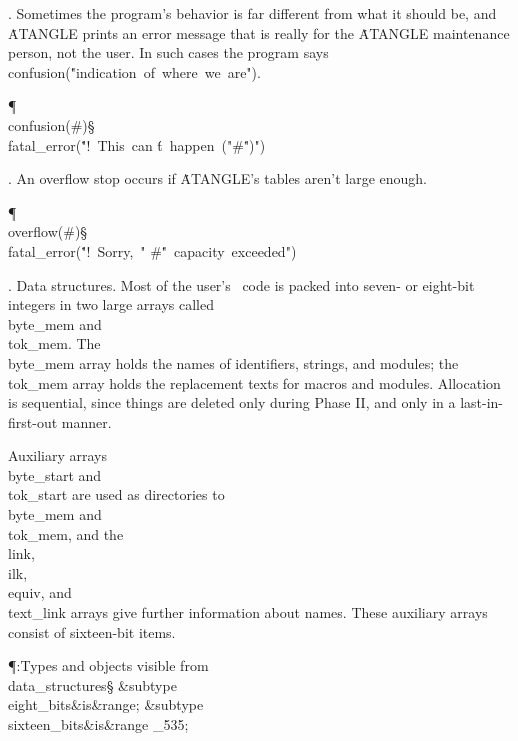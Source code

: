 . Sometimes the program's behavior is far different from what it should be,
and \.{ATANGLE} prints an error message that is really for the \.{ATANGLE}
maintenance person, not the user. In such cases the program says
\\{confusion}\?(\?\.{"indication\ of\ where\ we\ are"}\?)\?.

\Y\P\4\D\\{confusion}\?\1(\?\#\?\2)\S\?\\{fatal\_error}\?\1(\?\.{"!\ This\ can%
\'t\ happen\ ("}\?\mathbin{\.\&}\?\#\?\mathbin{\.\&}\?\.{")"}\?\2)\6
\?\par
\fi

. An overflow stop occurs if \.{ATANGLE}'s tables aren't large enough.

\Y\P\4\D\\{overflow}\?\1(\?\#\?\2)\S\?\\{fatal\_error}\?\1(\?\.{"!\ Sorry,\ "}%
\?\mathbin{\.\&}\?\#\?\mathbin{\.\&}\?\.{"\ capacity\ exceeded"}\?\2)\6
\?\par
\fi

.  Data structures.
Most of the user's \ADA\ code is packed into seven- or eight-bit integers
in two large arrays called \\{byte\_mem} and \\{tok\_mem}.
The \\{byte\_mem} array holds the names of identifiers, strings, and modules;
the \\{tok\_mem} array holds the replacement texts
for macros and modules. Allocation is sequential, since things are deleted
only during Phase II, and only in a last-in-first-out manner.

Auxiliary arrays \\{byte\_start} and \\{tok\_start} are used as directories to
\\{byte\_mem} and \\{tok\_mem}, and the \\{link}, \\{ilk}, \\{equiv}, and %
\\{text\_link}
arrays give further information about names. These auxiliary arrays
consist of sixteen-bit items.

\Y\P\?\4:Types and objects visible from \\{data\_structures}\X\mathrel{+}\S%
\?\6
\&{subtype}\8\\{eight\_bits}\8\&{is}\8\8\&{range}\?\to{};%
\6
\&{subtype}\8\\{sixteen\_bits}\8\&{is}\8\8\&{range}\?\to{}%
\_535;\par
\fi

